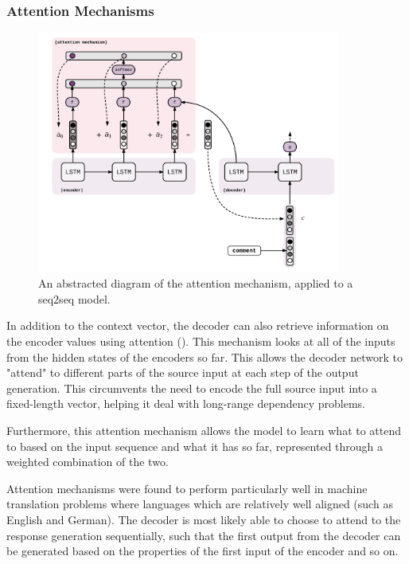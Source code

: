 \documentclass[12pt,twoside]{report}
\begin{document}
\subsubsection{Attention Mechanisms}

\begin{figure}[!ht]
      
	\centering
	\includegraphics[width=100mm]{diagrams/seq2seq_attention_mechanism.pdf}
	\caption{An abstracted diagram of the attention mechanism, applied to a seq2seq model.\label{seq2seq_attn}}
\end{figure}

In addition to the context vector, the decoder can also retrieve information on the encoder values using attention (\cite{bahdanau_neural_2014}). This mechanism looks at all of the inputs from the hidden states of the encoders so far. This allows the decoder network to "attend" to different parts of the source input at each step of the output generation. This circumvents the need to encode the full source input into a fixed-length vector, helping it deal with long-range dependency problems.

Furthermore, this attention mechanism allows the model to learn what to attend to based on the input sequence and what it has so far, represented through a weighted combination of the two.

Attention mechanisms were found to perform particularly well in machine translation problems where languages which are relatively well aligned (such as English and German). The decoder is most likely able to choose to attend to the response generation sequentially, such that the first output from the decoder can be generated based on the properties of the first input of the encoder and so on.
\end{document}
